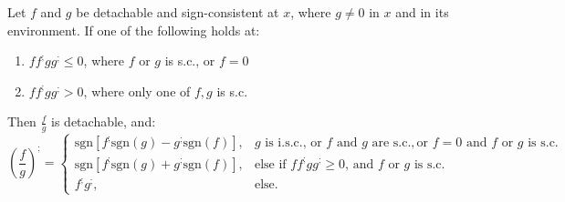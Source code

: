 \documentclass[11pt]{book}
\begin{document}
\begin{theorem}Let $f$ and $g$ be detachable and sign-consistent at $x$, where $g\neq0$ in $x$ and in its environment. If one of the following holds at:

\begin{enumerate}
\item $ff^{;}gg^{;}\leq0$, where $f$ or $g$ is s.c., or $f=0$
\item $ff^{;}gg^{;}>0$, where only one of $f,g$ is s.c.
\end{enumerate}

Then $\frac{f}{g}$ is detachable, and: $$\left(\frac{f}{g}\right)^{;}=\begin{cases}
\text{sgn}\left[f^{;}\text{sgn}\left(g\right)-g^{;}\text{sgn}\left(f\right)\right], & g\text{ is i.s.c., or }f\text{ and }g\text{ are s.c.},\text{or }f=0\text{ and }f\text{ or }g\text{ is s.c.}\\
\text{sgn}\left[f^{;}\text{sgn}\left(g\right)+g^{;}\text{sgn}\left(f\right)\right], & \text{else if }ff^{;}gg^{;}\geq0\text{, and }f\text{ or }g\text{ is s.c.}\\
f^{;}g^{;}, & \text{else.}
\end{cases}$$
\label{quotient_rule}
\end{theorem}
\end{document}
